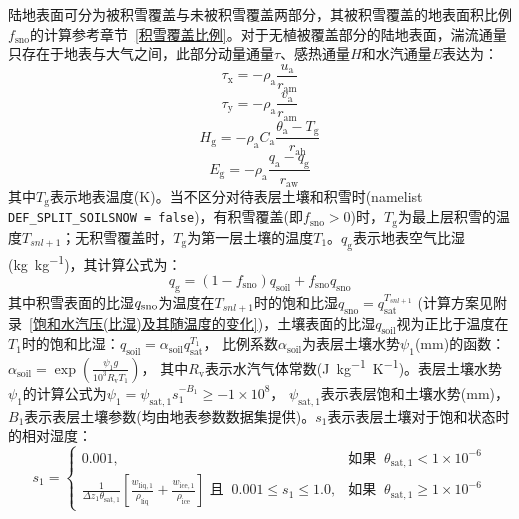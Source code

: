 陆地表面可分为被积雪覆盖与未被积雪覆盖两部分，其被积雪覆盖的地表面积比例$f_{\mathrm{sno}}$的计算参考章节~\ref{积雪覆盖比例}。对于无植被覆盖部分的陆地表面，湍流通量只存在于地表与大气之间，此部分动量通量$\tau$、感热通量$H$和水汽通量$E$表达为：
\begin{equation}\label{tau_x}
  \tau_{\mathrm{x}}=-\rho_{\mathrm{a}} \frac{u_{\mathrm{a}}}{r_{\mathrm{a m}}}
\end{equation}
\begin{equation}\label{tau_y}
  \tau_{\mathrm{y}}=-\rho_{\mathrm{a}} \frac{v_{\mathrm{a}}}{r_{\mathrm{a m}}}
\end{equation}
\begin{equation}\label{Hg}
  H_{\mathrm{g}}=-\rho_{\mathrm{a}} C_{\mathrm{a}} \frac{\theta_{\mathrm{a}}-T_{\mathrm{g}}}{r_{\mathrm{a h}}}
\end{equation}
\begin{equation}\label{Eg}
  E_{\mathrm{g}}=-\rho_{\mathrm{a}} \frac{q_{\mathrm{a}}-q_{\mathrm{g}}}{r_{\mathrm{a w}}}
\end{equation}
其中$T_{\mathrm {g}}$表示地表温度(K)。当不区分对待表层土壤和积雪时(namelist \allowbreak \texttt{DEF\_SPLIT\_\allowbreak SOILSNOW \allowbreak = \allowbreak false})，有积雪覆盖(即$f_{\mathrm{sno}}>0$)时，$T_{\mathrm {g}}$为最上层积雪的温度$T_{snl+1}$；无积雪覆盖时，$T_{\mathrm {g}}$为第一层土壤的温度$T_1$。$q_{\mathrm {g}}$表示地表空气比湿(\unit{kg.kg^{-1}})，其计算公式为：
\begin{equation}\label{qg}
  q_{\mathrm{g}}=\left(1-f_{\mathrm{{sno }}}\right) q_{\mathrm{{soil }}}+f_{\mathrm{{sno }}} q_{\mathrm{{sno }}}
\end{equation}
其中积雪表面的比湿$q_{\rm sno}$为温度在$T_{snl+1}$时的饱和比湿$q_{\mathrm{sno}}=q_{\mathrm{sat}}^{T_{snl+1}}$
(计算方案见附录~\ref{饱和水汽压(比湿)及其随温度的变化})，土壤表面的比湿$q_{\mathrm{soil}}$视为正比于温度在$T_1$时的饱和比湿：$q_{\mathrm{soil}}=\alpha_{\mathrm{soil}}q_{\mathrm{sat}}^{T_1}$，
比例系数$\alpha_{\mathrm{soil}}$为表层土壤水势$\psi_1$(mm)的函数\citep{philip1957theory}：$\alpha_{\mathrm{soil}}=\exp \left(\frac{\psi_1g}{{10}^3R_{\mathrm{v}}T_1}\right)$，
其中$R_{\mathrm{v}}$表示水汽气体常数(\unit{J.kg^{-1}.K^{-1}})。表层土壤水势$\psi_1$的计算公式为$\psi_1=\psi_{\mathrm{sat,1}}s_1^{-B_1}\geqslant-1\times{10}^8$，
$\psi_{\mathrm{sat,1}}$表示表层饱和土壤水势(mm)，$B_1$表示表层土壤\citep{clapp1978empirical}参数(均由地表参数数据集提供)。$s_1$表示表层土壤对于饱和状态时的相对湿度：
\begin{equation}
  s_{1}= \begin{cases}
    0.001, & \text {如果 }\ \theta_{\mathrm{sat, 1}}<1 \times 10^{-6} \\
    \frac{1}{\Delta z_{1} \theta_{\mathrm{sat, 1}}}\left[\frac{w_{\mathrm{liq, 1}}}{\rho_{\mathrm{liq}}}+\frac{w_{\mathrm{ice, 1}}}{\rho_{\mathrm{ice}}}\right]  \text{ 且  }\  0.001 \leqslant s_{1} \leqslant 1.0, & \text {如果 }\ \theta_{\mathrm{sat, 1}} \geqslant 1 \times 10^{-6}
  \end{cases}
\end{equation}
